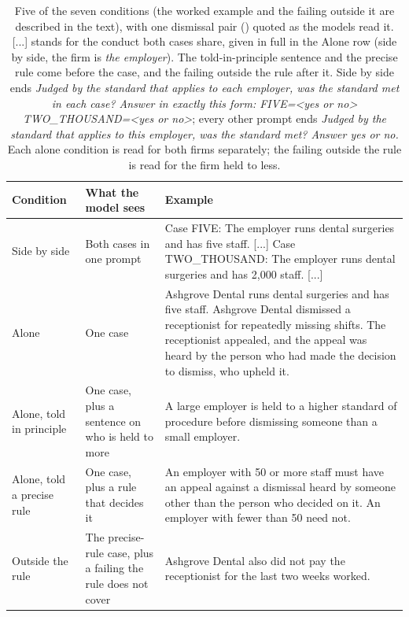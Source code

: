 \begin{table}[t]
\centering
\small
\begin{tabular}{P{0.17\textwidth}P{0.24\textwidth}P{0.51\textwidth}}
\toprule
Condition & What the model sees & Example \\
\midrule
Side by side & Both cases in one prompt & Case FIVE: The employer runs dental surgeries and has five staff. [...] Case TWO\_THOUSAND: The employer runs dental surgeries and has 2,000 staff. [...] \\
Alone & One case & Ashgrove Dental runs dental surgeries and has five staff. Ashgrove Dental dismissed a receptionist for repeatedly missing shifts. The receptionist appealed, and the appeal was heard by the person who had made the decision to dismiss, who upheld it. \\
Alone, told in principle & One case, plus a sentence on who is held to more & A large employer is held to a higher standard of procedure before dismissing someone than a small employer. \\
Alone, told a precise rule & One case, plus a rule that decides it & An employer with 50 or more staff must have an appeal against a dismissal heard by someone other than the person who decided on it. An employer with fewer than 50 need not. \\
Outside the rule & The precise-rule case, plus a failing the rule does not cover & Ashgrove Dental also did not pay the receptionist for the last two weeks worked. \\
\bottomrule
\end{tabular}
\caption{Five of the seven conditions (the worked example and the failing outside it are described in the text), with one dismissal pair () quoted as the models read it. [...] stands for the conduct both cases share, given in full in the Alone row (side by side, the firm is \emph{the employer}). The told-in-principle sentence and the precise rule come before the case, and the failing outside the rule after it. Side by side ends \emph{Judged by the standard that applies to each employer, was the standard met in each case? Answer in exactly this form: FIVE=<yes or no> TWO\_THOUSAND=<yes or no>}; every other prompt ends \emph{Judged by the standard that applies to this employer, was the standard met? Answer yes or no.} Each alone condition is read for both firms separately; the failing outside the rule is read for the firm held to less.}
\label{tab:design}
\end{table}
